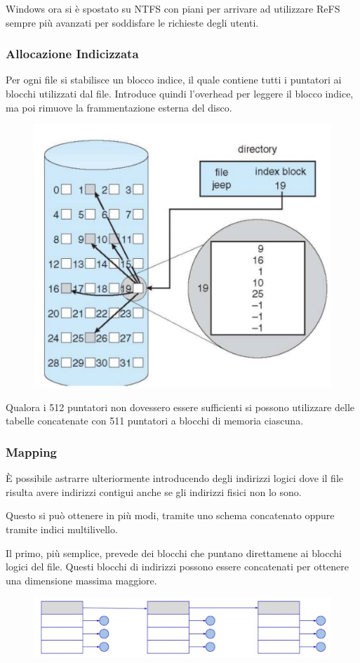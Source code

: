 Windows ora si è spostato su NTFS con piani per arrivare ad utilizzare ReFS  sempre più avanzati per soddisfare le richieste degli utenti.

\subsubsection{Allocazione Indicizzata}
Per ogni file si stabilisce un blocco indice, il quale contiene tutti i puntatori ai blocchi utilizzati dal file. Introduce quindi l'overhead per leggere il blocco indice, ma poi rimuove la frammentazione esterna del disco.

\begin{figure}[H]
    \centering
    \includegraphics[width=0.5\linewidth]{assets/allocazione-indicizzata.jpg}
\end{figure}

Qualora i 512 puntatori non dovessero essere sufficienti si possono utilizzare delle tabelle concatenate con 511 puntatori a blocchi di memoria ciascuna.

\subsubsection{Mapping}
È possibile astrarre ulteriormente introducendo degli indirizzi logici dove il file risulta avere indirizzi contigui anche se gli indirizzi fisici non lo sono.

\spacer
Questo si può ottenere in più modi, tramite uno schema concatenato oppure tramite indici multilivello.

\spacer
Il primo, più semplice, prevede dei blocchi che puntano direttamene ai blocchi logici del file. Questi blocchi di indirizzi possono essere concatenati per ottenere una dimensione massima maggiore.

\begin{figure}[H]
    \centering
    \includegraphics[width=0.5\linewidth]{assets/schema-concatenato.jpeg}
\end{figure}

